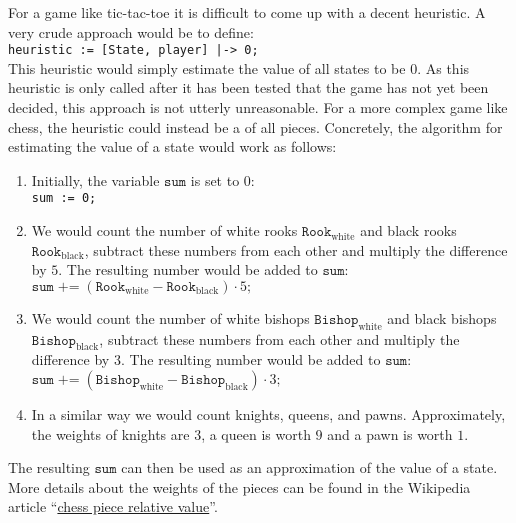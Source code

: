 For a game like tic-tac-toe it is difficult to come up with a decent heuristic.  A very crude approach would be
to define:
\\[0.2cm]
\hspace*{1.3cm}
\texttt{heuristic := [State, player] |-> 0;}
\\[0.2cm]
This heuristic would simply estimate the value of all states to be $0$.  As this heuristic is only called after
it has been tested that the game has not yet been decided, this approach is not utterly unreasonable.  For a more
complex game like chess, the heuristic could instead be a  of all pieces.  Concretely, the
algorithm for estimating the value of a state would work as follows:
\begin{enumerate}
\item Initially, the variable $\texttt{sum}$ is set to $0$:
      \\[0.2cm]
      \hspace*{1.3cm}
      \texttt{sum := 0;}
\item We would count the number of white rooks $\texttt{Rook}_{\mathrm{white}}$ and black rooks $\texttt{Rook}_{\mathrm{black}}$,
      subtract these numbers from each other and multiply the difference by $5$.  
      The resulting number would be added to $\texttt{sum}$:
      \\[0.2cm]
      \hspace*{1.3cm}
      $\texttt{sum} \;\texttt{+=}\; (\texttt{Rook}_{\mathrm{white}} - \texttt{Rook}_{\mathrm{black}}) \cdot 5\texttt{;}$
\item We would count the number of white bishops $\texttt{Bishop}_{\mathrm{white}}$ and black bishops
      $\texttt{Bishop}_{\mathrm{black}}$,
      subtract these numbers from each other and multiply the difference by $3$.  
      The resulting number would be added to $\texttt{sum}$:
      \\[0.2cm]
      \hspace*{1.3cm}
      $\texttt{sum} \;\texttt{+=}\; (\texttt{Bishop}_{\mathrm{white}} - \texttt{Bishop}_{\mathrm{black}}) \cdot 3\texttt{;}$
\item In a similar way we would count knights, queens, and pawns.  Approximately, the weights of
      knights are $3$, a queen is worth $9$ and a pawn is worth $1$.
\end{enumerate}
The resulting $\texttt{sum}$ can then be used as an approximation of the value of a state.
More details about the weights of the pieces can be found in the Wikipedia article 
``\href{https://en.wikipedia.org/wiki/Chess_piece_relative_value}{chess piece relative value}''.

